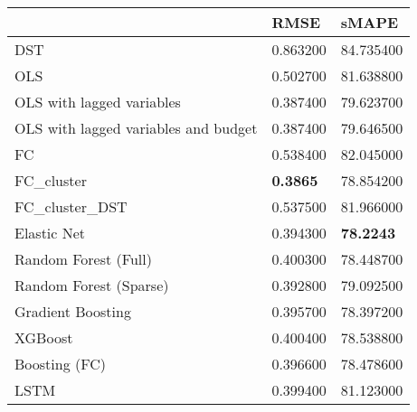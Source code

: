 \begin{tabular}{lll}
\toprule
 & RMSE & sMAPE \\
\midrule
DST & 0.863200 & 84.735400 \\
OLS & 0.502700 & 81.638800 \\
OLS with lagged variables & 0.387400 & 79.623700 \\
OLS with lagged variables and budget & 0.387400 & 79.646500 \\
FC & 0.538400 & 82.045000 \\
FC_cluster & \textbf{0.3865} & 78.854200 \\
FC_cluster_DST & 0.537500 & 81.966000 \\
Elastic Net & 0.394300 & \textbf{78.2243} \\
Random Forest (Full) & 0.400300 & 78.448700 \\
Random Forest (Sparse) & 0.392800 & 79.092500 \\
Gradient Boosting & 0.395700 & 78.397200 \\
XGBoost & 0.400400 & 78.538800 \\
Boosting (FC) & 0.396600 & 78.478600 \\
LSTM & 0.399400 & 81.123000 \\
\bottomrule
\end{tabular}
